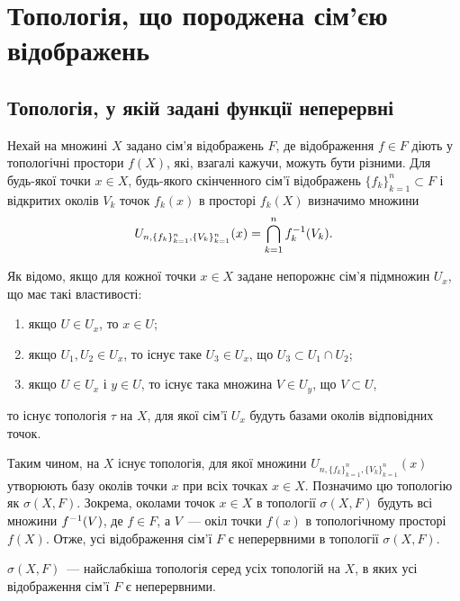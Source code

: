 \newcommand{\InducedNeighbourhood}[1]{U_{n,\{f_k\}_{k=1}^n,\{V_k\}_{k=1}^n}(#1)}

\chapter{Топологія, що породжена сім'єю відображень}

\section{Топологія, у якій задані функції неперервні}

Нехай на множині $X$ задано сім'я відображень $F$, де відображення $f \in F$ діють у топологічні простори $f(X)$, які, взагалі кажучи, можуть бути різними. Для будь-якої точки $x \in X$, будь-якого скінченного сім'ї відображень $\{f_k\}_{k = 1}^n \subset F$ і відкритих околів $V_k$ точок $f_k(x)$ в просторі $f_k(X)$ визначимо множини
\begin{equation*}
    \InducedNeighbourhood{x} = \Bigcap_{k = 1}^n f_k\inv(V_k).
\end{equation*}

Як відомо, якщо для кожної точки $x \in X$ задане непорожнє сім'я підмножин $U_x$, що має такі властивості:
\begin{enumerate}
    \item якщо $U \in U_x$, то $x \in U$;
    \item якщо $U_1, U_2 \in U_x$, то існує таке $U_3 \in U_x$, що $U_3 \subset U_1 \cap U_2$;
    \item якщо $U \in U_x$ і $y \in U$, то існує така множина $V \in U_y$, що $V \subset U$,
\end{enumerate}
то існує топологія $\tau$ на $X$, для якої сім'ї $U_x$ будуть базами околів відповідних точок. 

Таким чином, на $X$ існує топологія, для якої множини $\InducedNeighbourhood{x}$ утворюють базу околів точки $x$ при всіх точках $x \in X$. Позначимо цю топологію як $\sigma(X, F)$. Зокрема, околами точок $x \in X$ в топології $\sigma(X, F)$ будуть всі множини $f^{-1}(V)$, де $f \in F$, а $V$~--- окіл точки $f(x)$ в топологічному просторі $f(X)$. Отже, усі відображення сім'ї $F$ є неперервними в топології $\sigma(X, F)$.

\begin{theorem}
    $\sigma(X, F)$~--- найслабкіша топологія серед усіх топологій на $X$, в яких усі відображення сім'ї $F$ є неперервними.
\end{theorem}

